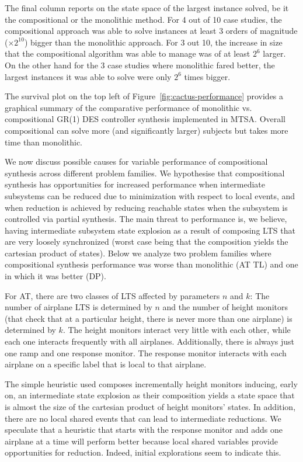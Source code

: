 The final column reports on the state space of the largest instance solved, be it the compositional or the monolithic method. For 4 out of 10 case studies, the compositional approach was able to solve instances at least 3 orders of magnitude  ($\times 2^{10}$) bigger than the monolithic approach. For 3 out 10, the increase in size that the compositional algorithm was able to manage was of at least $2^{6}$ larger. On the other hand for the 3 case studies where monolithic fared better, the largest instances it was able to solve were only $2^{6}$ times  bigger. 


The survival plot on the top left of Figure~\ref{fig:cactus-performance} provides a graphical summary of the comparative performance of monolithic vs. compositional GR(1) DES controller synthesis implemented in MTSA. Overall compositional can solve more (and significantly larger) subjects but takes more time than monolithic.

We now discuss possible causes for variable performance of  compositional synthesis across different problem families. We hypothesise that compositional synthesis has opportunities for increased performance when intermediate subsystems can be reduced due to minimization with respect to local events, and when reduction is achieved by reducing reachable states when the subsystem is controlled via partial synthesis.  The main threat to performance is, we believe, having intermediate subsystem state explosion as a result of composing LTS that are very loosely synchronized (worst case being that the composition yields the cartesian product of states). 
Below we analyze two problem families where compositional synthesis performance was worse than monolithic (AT   TL) and one in which it was better (DP). 

For AT, there are two classes of LTS affected by parameters $n$ and $k$: The number of airplane LTS is determined by $n$ and the number of height monitors (that check that at a particular height, there is never more than one airplane)  is determined by $k$. The height monitors interact very little with each other, while each one interacts frequently with all airplanes. Additionally, there is always just one ramp and one response monitor. The response monitor interacts with each airplane on a specific label that is local to that airplane. 

The simple heuristic used composes incrementally height monitors inducing, early on, an intermediate state explosion as their composition yields a state space that is almost the size of the cartesian product of height monitors' states. In addition, there are no local shared events that can lead to intermediate reductions.  
We speculate that a heuristic that starts with the response monitor and adds one airplane at a time will perform better because local shared variables provide opportunities for reduction. Indeed, initial explorations seem to indicate this. 

